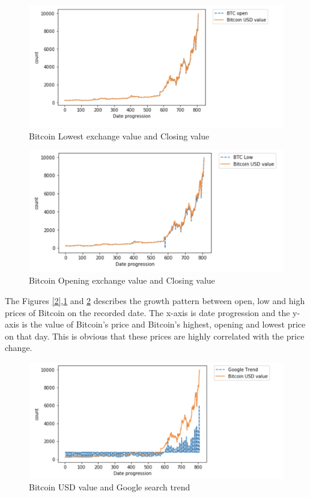 \documentclass[sigconf]{acmart}
\begin{document}
\begin{figure}[!ht]
  \centering\includegraphics[width=\columnwidth]{images/Open.png}
  \caption{Bitcoin Lowest exchange value and Closing value }
  \label{3}
\end{figure}

\begin{figure}[!ht]
  \centering\includegraphics[width=\columnwidth]{images/low.png}
  \caption{Bitcoin Opening exchange value and Closing value}
  \label{4}
\end{figure}

The Figures \ref{2},\ref{3} and \ref{4} describes the growth pattern between open, low and high prices of Bitcoin on the recorded date.
The x-axis is date progression and the y-axis is the value of Bitcoin's price and Bitcoin's highest, opening and lowest price on that day. This is obvious that these prices are highly correlated with the price change.

\begin{figure}[!ht]
  \centering\includegraphics[width=\columnwidth]{images/googletrend.png}
  \caption{Bitcoin USD value and Google search trend}
  \label{5}
\end{figure}
\end{document}
